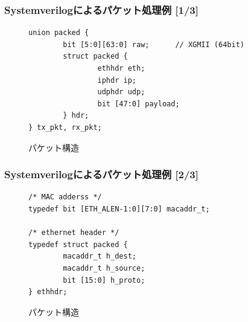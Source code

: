 \documentclass[10pt, compress]{beamer}
\begin{document}

\begin{frame}[fragile,t]
  \frametitle{Systemverilogによるパケット処理例 [1/3]}

\begin{figure}

\begin{verbatim}
union packed {
        bit [5:0][63:0] raw;      // XGMII (64bit)
        struct packed {
                ethhdr eth;
                iphdr ip;
                udphdr udp;
                bit [47:0] payload;
        } hdr;
} tx_pkt, rx_pkt;
\end{verbatim}
\vspace{-1em}
\caption{パケット構造}
\end{figure}

\end{frame}



\begin{frame}[fragile,t]
  \frametitle{Systemverilogによるパケット処理例 [2/3]}

\begin{figure}
\begin{verbatim}
/* MAC adderss */
typedef bit [ETH_ALEN-1:0][7:0] macaddr_t;

/* ethernet header */
typedef struct packed {
        macaddr_t h_dest;
        macaddr_t h_source;
        bit [15:0] h_proto;
} ethhdr;
\end{verbatim}
\vspace{-1em}
\caption{パケット構造}
\end{figure}

\end{frame}

\end{document}
